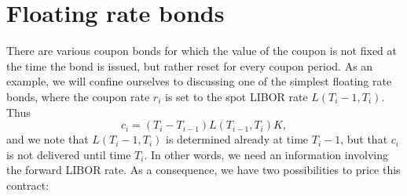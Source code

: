 \section{Floating rate bonds}
There are various coupon bonds for which the value of the coupon is not fixed at the time the bond is issued, but rather reset for every coupon period. As an example, we will confine ourselves to discussing one of the simplest floating rate bonds, where the coupon rate $r_i$ is set to the spot LIBOR rate $L(T_i-1,T_i)$. Thus
\begin{equation*}
    c_i = (T_i - T_{i-1})L(T_{i-1}, T_i)K,
\end{equation*}
and we note that $L(T_i-1,T_i)$ is determined already at time $T_i-1$, but that $c_i$ is not delivered until time $T_i$. In other words, we need an information involving the forward LIBOR rate. As a consequence, we have two possibilities to price this contract:
